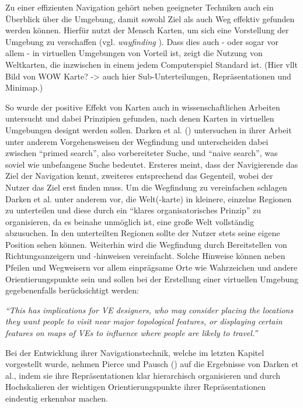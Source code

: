 Zu einer effizienten Navigation gehört neben geeigneter Techniken auch ein Überblick über die Umgebung, damit sowohl Ziel als auch Weg effektiv gefunden werden können.
Hierfür nutzt der Mensch Karten, um sich eine Vorstellung der Umgebung zu verschaffen (vgl. \textit{wayfinding} \cite{Bowman2001AnDesign}). Dass dies auch - oder sogar vor allem - in virtuellen Umgebungen von Vorteil ist, zeigt die Nutzung von Weltkarten, die inzwischen in einem jedem Computerspiel Standard ist. (Hier vllt Bild von WOW Karte? -> auch hier Sub-Unterteilungen, Repräsentationen und Minimap.)

So wurde der positive Effekt von Karten auch in wissenschaftlichen Arbeiten untersucht und dabei Prinzipien gefunden, nach denen Karten in virtuellen Umgebungen designt werden sollen.
Darken et al. (\cite{12_Darken1996_WayfindingStrategies}) untersuchen in ihrer Arbeit unter anderem Vorgehensweisen der Wegfindung und unterscheiden dabei zwischen “primed search”, also vorbereiteter Suche, und “naive search”, was soviel wie unbefangene Suche bedeutet.
Ersteres meint, dass der Navigierende das Ziel der Navigation kennt, zweiteres entsprechend das Gegenteil, wobei der Nutzer das Ziel erst finden muss.
Um die Wegfindung zu vereinfachen schlagen Darken et al. unter anderem vor, die Welt(-karte) in kleinere, einzelne Regionen zu unterteilen und diese durch ein “klares organisatorisches Prinzip” zu organisieren, da es beinahe unmöglich ist, eine große Welt vollständig abzusuchen. In den unterteilten Regionen sollte der Nutzer stets seine eigene Position sehen können. 
Weiterhin wird die Wegfindung durch Bereitstellen von Richtungsanzeigern und -hinweisen vereinfacht. Solche Hinweise können neben Pfeilen und Wegweisern vor allem einprägsame Orte wie Wahrzeichen und andere Orientierungspunkte sein und sollen bei der Erstellung einer virtuellen Umgebung gegebenenfalls berücksichtigt werden:

\textit{“This has implications for VE designers, who may consider placing the locations they want
people to visit near major topological features, or displaying certain features on maps of
VEs to influence where people are likely to travel.”}

Bei der Entwicklung ihrer Navigationstechnik, welche im letzten Kapitel vorgestellt wurde, nehmen Pierce und Pausch (\cite{pierce_representations}) auf die Ergebnisse von Darken et al., indem sie ihre Repräsentationen klar hierarchisch organisieren und durch Hochskalieren der wichtigen Orientierungspunkte ihrer Repräsentationen eindeutig erkennbar machen.


